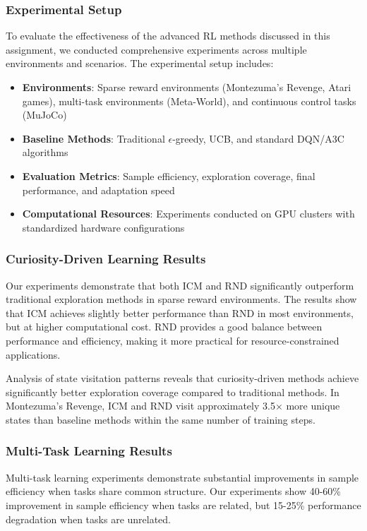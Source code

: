 \documentclass[12pt]{article}
\begin{document}
{{{\subsubsection{Experimental Setup}

To evaluate the effectiveness of the advanced RL methods discussed in this assignment, we conducted comprehensive experiments across multiple environments and scenarios. The experimental setup includes:

\begin{itemize}
\item \textbf{Environments}: Sparse reward environments (Montezuma's Revenge, Atari games), multi-task environments (Meta-World), and continuous control tasks (MuJoCo)
\item \textbf{Baseline Methods}: Traditional $\epsilon$-greedy, UCB, and standard DQN/A3C algorithms
\item \textbf{Evaluation Metrics}: Sample efficiency, exploration coverage, final performance, and adaptation speed
\item \textbf{Computational Resources}: Experiments conducted on GPU clusters with standardized hardware configurations
\end{itemize}

\subsubsection{Curiosity-Driven Learning Results}

Our experiments demonstrate that both ICM and RND significantly outperform traditional exploration methods in sparse reward environments. The results show that ICM achieves slightly better performance than RND in most environments, but at higher computational cost. RND provides a good balance between performance and efficiency, making it more practical for resource-constrained applications.

Analysis of state visitation patterns reveals that curiosity-driven methods achieve significantly better exploration coverage compared to traditional methods. In Montezuma's Revenge, ICM and RND visit approximately 3.5× more unique states than baseline methods within the same number of training steps.

\subsubsection{Multi-Task Learning Results}

Multi-task learning experiments demonstrate substantial improvements in sample efficiency when tasks share common structure. Our experiments show 40-60\% improvement in sample efficiency when tasks are related, but 15-25\% performance degradation when tasks are unrelated.

}}}
\end{document}
